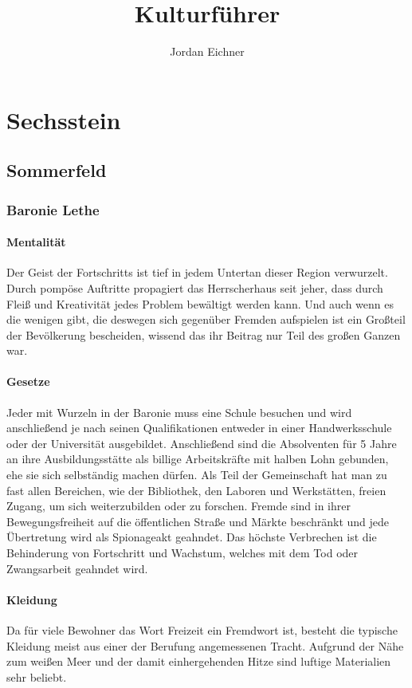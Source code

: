 \documentclass[a4paper,12pt,oneside]{book}
\title{Kulturführer}
\author{Jordan Eichner}
\date{}
\begin{document}
\maketitle
\tableofcontents



\part{Sechsstein}

\chapter{Sommerfeld}
\section{Baronie Lethe}
\subsection{Mentalität}
Der Geist der Fortschritts ist tief in jedem Untertan dieser Region verwurzelt. Durch pompöse Auftritte propagiert das Herrscherhaus seit jeher, dass durch Fleiß und Kreativität jedes Problem bewältigt werden kann. Und auch wenn es die wenigen gibt, die deswegen sich gegenüber Fremden aufspielen ist ein Großteil der Bevölkerung bescheiden, wissend das ihr Beitrag nur Teil des großen Ganzen war.
\subsection{Gesetze}
Jeder mit Wurzeln in der Baronie muss eine Schule besuchen und wird anschließend je nach seinen Qualifikationen entweder in einer Handwerksschule oder der Universität ausgebildet. Anschließend sind die Absolventen für 5 Jahre an ihre Ausbildungsstätte als billige Arbeitskräfte mit halben Lohn gebunden, ehe sie sich selbständig machen dürfen. Als Teil der Gemeinschaft hat man zu fast allen Bereichen, wie der Bibliothek, den Laboren und Werkstätten, freien Zugang, um sich weiterzubilden oder zu forschen. Fremde sind in ihrer Bewegungsfreiheit auf die öffentlichen Straße und Märkte beschränkt und jede Übertretung wird als Spionageakt geahndet. Das höchste Verbrechen ist die Behinderung von Fortschritt und Wachstum, welches mit dem Tod oder Zwangsarbeit geahndet wird.
\subsection{Kleidung}
 Da für viele Bewohner das Wort Freizeit ein Fremdwort ist, besteht die typische Kleidung meist aus einer der Berufung angemessenen Tracht. Aufgrund der Nähe zum weißen Meer und der damit einhergehenden Hitze sind luftige Materialien sehr beliebt.
 
\end{document}
